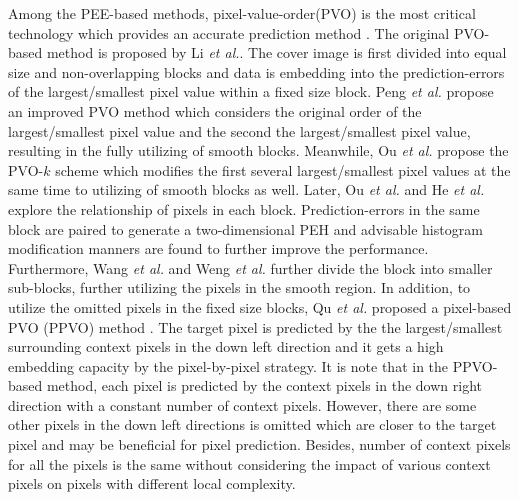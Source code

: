 \documentclass[review,3p,10pt,sort&compress]{elsarticle}
\begin{document}
Among the PEE-based methods, pixel-value-order(PVO) is the most critical technology which provides an accurate prediction method \cite{
Li2013PVO,
Peng2014IPVO,
Ou2014PVOk,
Qu2015PPVO,
Xiang2015A,
Bo2016Improved,
Weng2016Reversible,
Weng2017Optimal,
He2018Reversible,
Kim2018Skewed}.
The original PVO-based method \cite{Li2013PVO} is proposed by Li \emph{et al.}. The cover image is first divided into equal size and non-overlapping blocks and data is embedding into the prediction-errors of the largest/smallest pixel value within a fixed size block.
Peng \emph{et al.} propose an improved PVO method \cite{Peng2014IPVO} which considers the original order of the largest/smallest pixel value and the second the largest/smallest pixel value, resulting in the fully utilizing of smooth blocks. Meanwhile, Ou \emph{et al.} propose the PVO-$k$ scheme \cite{Ou2014PVOk} which modifies the first several largest/smallest pixel values at the same time to utilizing of smooth blocks as well.
Later, Ou \emph{et al.} \cite{Bo2016Improved} and He \emph{et al.} \cite{He2018Reversible} explore the relationship of pixels in each block. Prediction-errors in the same block are paired to generate a two-dimensional PEH and advisable histogram modification manners are found to further improve the performance.
Furthermore, Wang \emph{et al.} \cite{Xiang2015A} and Weng \emph{et al.} \cite{Weng2016Reversible} further divide the block into smaller sub-blocks, further utilizing the pixels in the smooth region.
In addition, to utilize the omitted pixels in the fixed size blocks, Qu \emph{et al.} proposed a pixel-based PVO (PPVO) method \cite{Qu2015PPVO}. The target pixel is predicted by the the largest/smallest surrounding context pixels in the down left direction and it gets a high embedding capacity by the pixel-by-pixel strategy.
It is note that in the PPVO-based method, each pixel is predicted by the context pixels in the down right direction with a constant number of context pixels. However, there are some other pixels in the down left directions is omitted which are closer to the target pixel and may be beneficial for pixel prediction. Besides, number of context pixels for all the pixels is the same without considering the impact of various context pixels on pixels with different local complexity.
\end{document}
